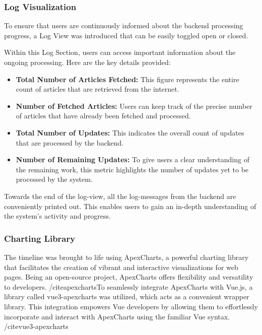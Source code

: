 \documentclass[a4paper,10pt]{report} %
\begin{document}
\subsubsection{Log Visualization}
To ensure that users are continuously informed about the backend processing progress, a Log View was introduced that can be easily toggled open or closed.

Within this Log Section, users can access important information about the ongoing processing. Here are the key details provided:

\begin{itemize}
  \item \textbf{Total Number of Articles Fetched:} This figure represents the entire count of articles that are retrieved from the internet.

  \item \textbf{Number of Fetched Articles:} Users can keep track of the precise number of articles that have already been fetched and processed.

  \item \textbf{Total Number of Updates:} This indicates the overall count of updates that are processed by the backend.

  \item \textbf{Number of Remaining Updates:} To give users a clear understanding of the remaining work, this metric highlights the number of updates yet to be processed by the system.
\end{itemize}

Towards the end of the log-view, all the log-messages from the backend are conveniently printed out. This enables users to gain an in-depth understanding of the system's activity and progress.

\subsubsection{Charting Library}
The timeline was brought to life using ApexCharts, a powerful charting library that facilitates the creation of vibrant and interactive visualizations for web pages. Being an open-source project, ApexCharts offers flexibility and versatility to developers. /cite{apexcharts}To seamlessly integrate ApexCharts with Vue.js, a library called vue3-apexcharts was utilized, which acts as a convenient wrapper library. This integration empowers Vue developers by allowing them to effortlessly incorporate and interact with ApexCharts using the familiar Vue syntax. /cite{vue3-apexcharts}
\end{document}
